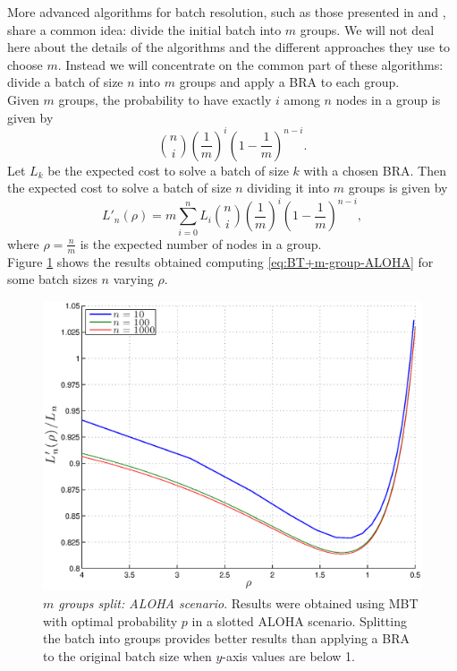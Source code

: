 \documentclass[12pt,a4paper]{report}
\begin{document}
More advanced algorithms for batch resolution, such as those presented in \cite{cidon} and \cite{greenberg87}, share a common idea: divide the initial batch into $m$ groups. We will not deal here about the details of the algorithms and the different approaches  they use to choose $m$. Instead we will concentrate on the common part of these algorithms: divide a batch of size $n$ into $m$ groups and apply a BRA to each group.\\
Given $m$ groups, the probability to have exactly $i$ among $n$ nodes in a group is given by
\begin{equation}
{n \choose i} \left(\frac{1}{m}\right)^{i} \left(1-\frac{1}{m}\right)^{n-i}.
\end{equation}
Let $L_{k}$ be the expected cost to solve a batch of size $k$ with a chosen BRA. Then the expected cost to solve a batch of size $n$ dividing it into $m$ groups is given by
\begin{equation}
\label{eq:BT+m-group-ALOHA}
L'_{n}(\rho)=m \sum_{i=0}^{n}L_{i}{n \choose i} \left(\frac{1}{m}\right)^{i} \left(1-\frac{1}{m}\right)^{n-i},
\end{equation}
where $\rho={\displaystyle\frac{n}{m}}$ is the expected number of nodes in a group.\\

\noindent Figure \ref{m-groups-MBT-ALOHA} shows the results obtained computing  \eqref{eq:BT+m-group-ALOHA} for some batch sizes $n$ varying $\rho$.


\begin{figure}[H]
\begin{center}
\includegraphics[scale=0.7]{matlab/BTs/m-groups-MBT-ALOHA}
\caption[$m$ groups split: ALOHA scenario]{\emph{$m$ groups split: ALOHA scenario}. Results were obtained using MBT with optimal probability $p$ in a slotted ALOHA scenario. Splitting the batch into groups provides better results than applying a BRA to the original batch size when $y$-axis values are below 1.}
\label{m-groups-MBT-ALOHA}
\end{center}
\end{figure}
\end{document}
